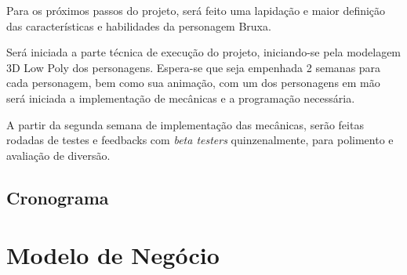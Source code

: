 Para os próximos passos do projeto, será feito uma lapidação e maior definição das características e habilidades da personagem Bruxa.

Será iniciada a parte técnica de execução do projeto, iniciando-se pela modelagem 3D Low Poly dos personagens. Espera-se que seja empenhada 2 semanas para cada personagem, bem como sua animação, com um dos personagens em mão será iniciada a implementação de mecânicas e a programação necessária.

A partir da segunda semana de implementação das mecânicas, serão feitas rodadas de testes e feedbacks com \textit{beta testers} quinzenalmente, para polimento e avaliação de diversão.


\section{Cronograma}


\chapter{Modelo de Negócio}


